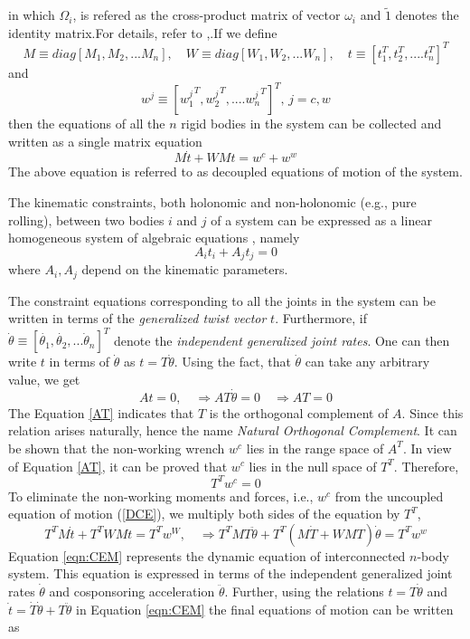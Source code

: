 in which  $\Omega_i$, is refered as the cross-product matrix of vector $\omega_i$ and $\tilde{1}$ denotes the identity matrix.For details, refer to \cite{angeles2013fundamentals},\cite{saha2010robotics}.If we define 
\[M \equiv diag[M_1,M_2,...M_n], \quad W \equiv diag[W_1,W_2,...W_n], \quad t \equiv [t_1^T,t_2^T, ....t_n^T]^T\] 
and 
\[ w^j \equiv [{w_1^j}^T,{w_2^j}^T, ....{w_n^j}^T]^T, \,j=c,w \]
then the equations of all the $n$ rigid bodies in the system can be collected and written as a single matrix equation 
\begin{equation}
\label{DCE}
M\dot{t}+WMt=w^c+w^w
\end{equation}
 The above equation is referred to as  decoupled equations of motion of the system.



The kinematic constraints, both holonomic and non-holonomic (e.g., pure rolling), between two bodies $i$ and $j$ of a system can be expressed as a linear homogeneous system of algebraic equations \cite{angeles2013fundamentals}, namely 
\begin{equation}
A_it_i+A_jt_j=0
\end{equation}
where $A_i,A_j$ depend on the kinematic parameters.

The constraint equations corresponding to all the joints in the system can be written in terms of the \textit{generalized twist vector} $t$. Furthermore, if $ \dot{\theta} \equiv[\dot{\theta_1},\dot{\theta_2},...\dot\theta_n]^T$ denote the \textit{independent generalized joint rates}. One can then write $t$ in terms of $\dot{\theta}$ as $t=T\dot{\theta}$. 
Using the fact, that $\dot{\theta}$ can take any arbitrary value, we get
\begin{equation}
\label{AT}
At=0 , \quad \Rightarrow  AT\dot{\theta}=0\quad \Rightarrow AT=0
\end{equation}
The Equation \ref{AT} indicates that $T$ is the orthogonal complement of $A$.
 Since this relation arises naturally, hence the name \textit{Natural Orthogonal Complement}.  It can be shown \cite{angeles2013fundamentals} that the non-working wrench $w^c$ lies in the range space of $A^T$.   In view of Equation \ref{AT}, it can be proved that $w^c$ lies in the null space of $T^T$. Therefore,
\begin{equation}
T^Tw^c=0
\end{equation}
To eliminate the non-working  moments and  forces, i.e., $w^c$ from the uncoupled equation of motion (\ref{DCE}), we multiply both sides of the equation  by $T^T$,
\begin{equation}
 T^TM\dot{t}+T^TWMt=T^Tw^W, \quad
 \Rightarrow T^TMT\ddot{\theta}+T^T(M\dot{T}+WMT)\dot{\theta}=T^Tw^w
 \label{eqn:CEM}
\end{equation}
Equation \ref{eqn:CEM} represents the dynamic equation of  interconnected $n$-body system.
 This equation is expressed in terms of the independent generalized joint rates $\dot{\theta}$ and cosponsoring  acceleration $\ddot{\theta}$. Further, using the relations $t=T\dot{\theta}$ and $\dot{t}=\dot{T}\dot{\theta}+T\ddot{\theta}$  in Equation \ref{eqn:CEM}  the final equations of motion can be written as

